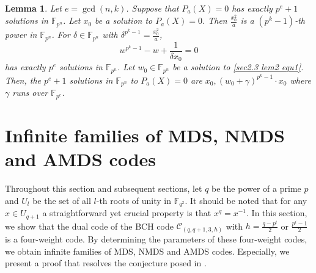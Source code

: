 \documentclass[sn-mathphys-num]{sn-jnl}%
\theoremstyle{thmstyleone}%
\newtheorem{lemma}{Lemma}
\theoremstyle{thmstyletwo}%
\theoremstyle{thmstylethree}%
\begin{document}
\begin{lemma}\cite[Lemma 17]{Kim2021COmpleteSolutionEquation}
	\label{sec2.3 lem2}
	Let $e=\gcd(n,k)$. Suppose that $P_a(X)=0$ has exactly $p^e+1$ solutions in $\mathbb{F}_{p^n}$. Let $x_0$ be a solution to $P_a(X)=0$. Then $\frac{x_{0}^{2}}{a}$ is a $(p^k-1)$-th power in $\mathbb{F}_{p^n}$. For $\delta\in\mathbb{F}_{p^n}$ with $\delta^{p^k-1}=\frac{x_{0}^{2}}{a}$,
	\begin{equation}\label{sec2.3 lem2 equ1}
		w^{p^k-1}-w+\frac{1}{\delta x_0}=0
	\end{equation}
	has exactly $p^e$ solutions in $\mathbb{F}_{p^n}$. Let $w_0\in\mathbb{F}_{p^n}$ be a solution to \cref{sec2.3 lem2 equ1}. Then, the $p^e+1$ solutions in $\mathbb{F}_{p^n}$ to $P_a(X)=0$ are $x_0,(w_0+\gamma)^{p^k-1}\cdot x_0$ where $\gamma$ runs over $\mathbb{F}_{p^e}$.
\end{lemma}


\section{Infinite families of MDS, NMDS and AMDS codes}\label{sec3}
Throughout this section and subsequent sections, let $q$ be the power of a prime $p$ and $U_l$ be the set of all $l$-th roots of unity in $\mathbb{F}_{q^2}$. It should be noted that for any $x\in U_{q+1}$ a straightforward yet crucial property is that $x^q=x^{-1}$. In this section, we show that the dual code of the BCH code $\mathcal{C}_{(q,q+1,3,h)}$ with $h=\frac{q-p^i}{2}$ or $\frac{p^i-1}{2}$ is a four-weight code. By determining the parameters of these four-weight codes, we obtain infinite families of MDS, NMDS and AMDS codes. Especially, we present a proof that resolves the conjecture posed in \cite[Conjecture 3.6]{Geng2022ClassAlmostMDS}.
\end{document}
